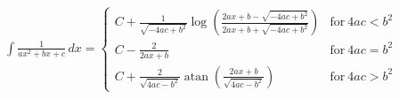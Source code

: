 \begin{align}
  \int \frac{1}{a x^{2} + b x + c}\, dx = \begin{cases} C + \frac{1}{\sqrt{- 4 a c + b^{2}}} \log{\left (\frac{2 a x + b - \sqrt{- 4 a c + b^{2}}}{2 a x + b + \sqrt{- 4 a c + b^{2}}} \right )} & \text{for}\: 4 a c < b^{2} \\C - \frac{2}{2 a x + b} & \text{for}\: 4 a c = b^{2} \\C + \frac{2}{\sqrt{4 a c - b^{2}}} \operatorname{atan}{\left (\frac{2 a x + b}{\sqrt{4 a c - b^{2}}} \right )} & \text{for}\: 4 a c > b^{2} \end{cases}
\end{align}